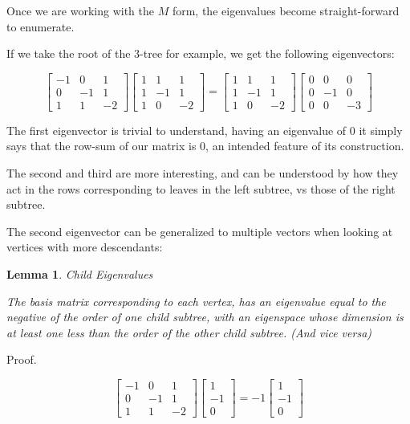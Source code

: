 \documentclass[10pt,a4paper]{report}
\newtheorem{lemma}{Lemma}
\begin{document}
Once we are working with the $M$ form, the eigenvalues become straight-forward to enumerate.

If we take the root of the 3-tree for example, we get the following
eigenvectors:

\begin{equation*}
\left[\begin{matrix}
	-1 & 0 & 1\\
	0 & -1 & 1\\
	1 & 1 & -2
\end{matrix}\right]
\left[\begin{matrix}
	1 & 1 & 1\\
	1 & -1 & 1\\
	1 & 0 & -2
\end{matrix}\right]
=
\left[\begin{matrix}
	1 & 1 & 1\\
	1 & -1 & 1\\
	1 & 0 & -2
\end{matrix}\right]
\left[\begin{matrix}
	0 & 0 & 0\\
	0 & -1 & 0\\
	0 & 0 & -3
\end{matrix}\right]
\end{equation*}

The first eigenvector is trivial to understand, having an eigenvalue of 0 it
simply says that the row-sum of our matrix is 0, an intended feature of its
construction.

The second and third are more interesting, and can be understood by how they
act in the rows corresponding to leaves in the left subtree, vs those of the
right subtree.

The second eigenvector can be generalized to multiple vectors when looking at
vertices with more descendants:

\begin{lemma} Child Eigenvalues

	The basis matrix corresponding to each vertex, has an eigenvalue equal to the
	negative of the order of one child subtree, with an eigenspace whose
	dimension is at least one less than the order of the other child subtree.
	(And vice versa)
\end{lemma}

Proof.

\begin{equation*}
\left[\begin{matrix}
	-1 & 0 & 1\\
	0 & -1 & 1\\
	1 & 1 & -2
\end{matrix}\right]
\left[\begin{matrix}
	1\\
	-1\\
	0
\end{matrix}\right]
=
-1
\left[\begin{matrix}
	1\\
	-1\\
	0
\end{matrix}\right]
\end{equation*}
\end{document}
